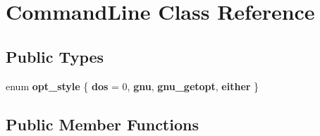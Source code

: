 \hypertarget{classCommandLine}{\section{Command\-Line Class Reference}
\label{classCommandLine}
}
\subsection*{Public Types}
\begin{DoxyCompactItemize}
\item 
enum {\bfseries opt\-\_\-style} \{ {\bfseries dos} = 0, 
{\bfseries gnu}, 
{\bfseries gnu\-\_\-getopt}, 
{\bfseries either}
 \}
\end{DoxyCompactItemize}
\subsection*{Public Member Functions}
